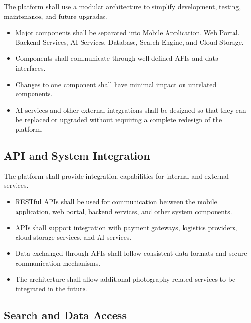 The platform shall use a modular architecture to simplify development,
testing, maintenance, and future upgrades.

\begin{itemize}
    \item Major components shall be separated into Mobile Application,
    Web Portal, Backend Services, AI Services, Database, Search Engine,
    and Cloud Storage.

    \item Components shall communicate through well-defined APIs and
    data interfaces.

    \item Changes to one component shall have minimal impact on
    unrelated components.

    \item AI services and other external integrations shall be designed
    so that they can be replaced or upgraded without requiring a complete
    redesign of the platform.
\end{itemize}

\subsection{API and System Integration}

The platform shall provide integration capabilities for internal and
external services.

\begin{itemize}
    \item RESTful APIs shall be used for communication between the mobile
    application, web portal, backend services, and other system components.

    \item APIs shall support integration with payment gateways, logistics
    providers, cloud storage services, and AI services.

    \item Data exchanged through APIs shall follow consistent data formats
    and secure communication mechanisms.

    \item The architecture shall allow additional photography-related
    services to be integrated in the future.
\end{itemize}

\subsection{Search and Data Access}

